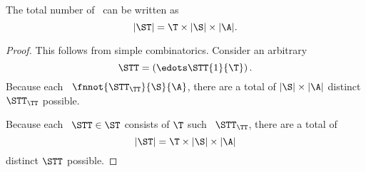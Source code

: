 \begin{proposition}
  The total number of \strs\ can be written as
  $$|\ST| = \T \times |\S| \times |\A|.$$%
\end{proposition}

\begin{proof}
  This follows from simple combinatorics.
  Consider an arbitrary \str
  $$\STT = \left(\edots\STT{1}{\T}\right).$$
  Because each \stpstr\ $\fnnot{\STT_\TT}{\S}{\A}$,
  there are a total of $|\S| \times |\A|$ distinct $\STT_\TT$ possible.

  Because each \str\ $\STT \in \ST$ consists of $\T$ such \stpstrs\ $\STT_\TT$,
  there are a total of 
  $$|\ST| = \T \times |\S| \times |\A|$$
  distinct $\STT$ possible.
\end{proof}
